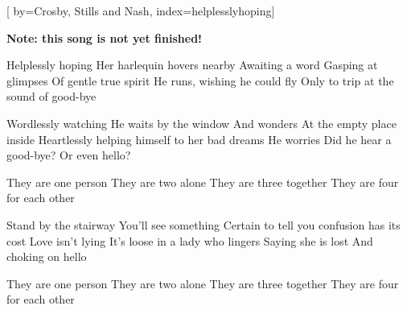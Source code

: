 
[%
    by={Crosby, Stills and Nash},
    index={helplesslyhoping}]


    \label{helplesslyhoping}

    \textbf{Note: this song is not yet finished!}

    \beginverse
        Helplessly hoping
        Her harlequin hovers nearby
        Awaiting a word
        Gasping at glimpses
        Of gentle true spirit
        He runs, wishing he could fly
        Only to trip at the sound of good-bye
    \endverse

    \beginverse
        Wordlessly watching
        He waits by the window
        And wonders
        At the empty place inside
        Heartlessly helping himself to her bad dreams
        He worries
        Did he hear a good-bye? Or even hello?
    \endverse

    \beginchorus
        They are one person
        They are two alone
        They are three together
        They are four for each other
    \endchorus

    \beginverse
        Stand by the stairway
        You'll see something
        Certain to tell you confusion has its cost
        Love isn't lying
        It's loose in a lady who lingers
        Saying she is lost
        And choking on hello
    \endverse

    \beginchorus
        They are one person
        They are two alone
        They are three together
        They are four for each other
    \endchorus
\endsong

